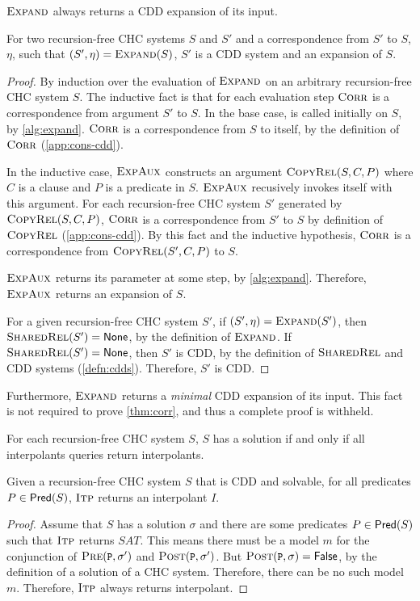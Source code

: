 $\textsc{Expand}$ always returns a CDD expansion of its input.
%
\begin{lem}
  \label{lem:expand-corr}
  For two recursion-free CHC systems $S$ and $S'$ and a correspondence
  from $S'$ to $S$, $\eta$, such that $(S', \eta) = \textsc{Expand}(S)$,
  $S'$ is a CDD system and an expansion of $S$.
\end{lem}
%
\begin{proof}
  By induction over the evaluation of $\textsc{Expand}$ on
  an arbitrary recursion-free CHC system $S$.
  The inductive fact is that for each evaluation step
  $\textsc{Corr}$ is a correspondence from argument
  $S'$ to $S$.
  In the base case, \expandaux is called initially on $S$,
  by \autoref{alg:expand}.
  $\textsc{Corr}$ is a correspondence from $S$ to itself, by the definition of
  $\textsc{Corr}$
  (\autoref{app:cons-cdd}).

  In the inductive case,
  $\textsc{ExpAux}$ constructs an argument
  $\textsc{CopyRel}(S, C, P)$
  where $C$ is a clause and $P$ is a predicate in $S$.
  $\textsc{ExpAux}$ recusively invokes itself with this argument.
  For each recursion-free CHC system $S'$ generated by $\textsc{CopyRel}(S, C, P)$,
  $\textsc{Corr}$ is a correspondence from $S'$ to
  $S$ by definition of $\textsc{CopyRel}$
  (\autoref{app:cons-cdd}).
  By this fact and the inductive hypothesis, $\textsc{Corr}$ is
  a correspondence from $\textsc{CopyRel}(S',
  C, P)$ to $S$.

  $\textsc{ExpAux}$ returns its parameter at some step, by
  \autoref{alg:expand}.
  Therefore, $\textsc{ExpAux}$ returns an expansion of $S$.

  For a given recursion-free CHC system $S'$, if $(S', \eta) =
  \textsc{Expand}(S')$,
  then $\textsc{SharedRel}(S') = \mathsf{None}$, by the definition of $\textsc{Expand}$.
  If $\textsc{SharedRel}(S') = \mathsf{None}$, then $S'$ is
  CDD, by the definition of $\textsc{SharedRel}$ and CDD systems
  (\autoref{defn:cdds}).
  Therefore, $S'$ is CDD.
\end{proof}
%
Furthermore, $\textsc{Expand}$ returns a \emph{minimal} CDD
expansion of its input.
%
This fact is not required to prove \autoref{thm:corr}, and thus a
complete proof is withheld.

For each recursion-free CHC system $S$, $S$ has a solution if and only
if all interpolants queries return interpolants.
%
\begin{lem}
  \label{lem:vc}
  Given a recursion-free CHC system $S$ that is CDD and solvable, for
  all predicates $P \in \mathsf{Pred}( S )$,
  $\textsc{Itp}$ returns
  an interpolant $I$.
\end{lem}
%
\begin{proof}
  Assume that $S$ has a solution $\sigma$ and there are some
  predicates $P \in \mathsf{Pred}( S )$ such that
  $\textsc{Itp}$
  returns $SAT$. This means there must be a model $m$ for the
  conjunction of $\prectr(\cc{P},\sigma')$ and
  $\postctr(\cc{P},\sigma')$.
  But $\postctr(\cc{P},\sigma) = \false$, by the definition of
  a solution of a CHC system.
  Therefore, there can be no such model $m$.
  Therefore,
  $\textsc{Itp}$ always
  returns interpolant.
\end{proof}

